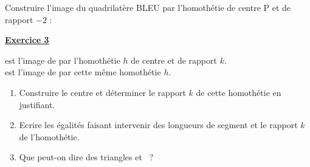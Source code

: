 \documentclass[a4paper]{article}
\def\ptmarksize{0.1}
\newcommand{\ptmark}[2]{%
  \draw[ptcol, line width=1.5pt] ({#1-\ptmarksize},{#2-\ptmarksize}) -- ({#1+\ptmarksize},{#2+\ptmarksize});%
  \draw[ptcol, line width=1.5pt] ({#1-\ptmarksize},{#2+\ptmarksize}) -- ({#1+\ptmarksize},{#2-\ptmarksize});%
}
\begin{document}
\vspace{0.6em}
\noindent
\begin{minipage}[t]{0.35\textwidth}
  \vspace{0pt}
  Construire l'image du quadrilatère BLEU par l'homothétie de centre P et de
  rapport $-2$ :
\end{minipage}%
\hfill%
\begin{minipage}[t]{0.61\textwidth}
  \vspace{0pt}
\end{minipage}

\bigskip\bigskip

\noindent\underline{\textbf{Exercice 3}}

\vspace{0.5em}
\noindent {} est l'image de  par l'homothétie $h$ de centre  et de rapport $k$.\\[0.2em]
 est l'image de  par cette même homothétie $h$.

\begin{enumerate}
  \item Construire le centre  et déterminer le rapport $k$ de cette homothétie en justifiant.
  \item Ecrire les égalités faisant intervenir des longueurs de segment et le rapport $k$ de l'homothétie.
  \item Que peut-on dire des triangles  et ~?
\end{enumerate}
\end{document}
